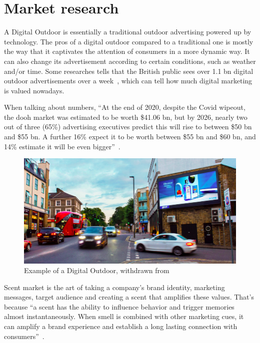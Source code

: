 \section{Market research}
\label{sec:market-research}
A Digital Outdoor is essentially a traditional outdoor advertising powered up by technology. 
The pros of a digital outdoor compared to a traditional one is mostly the way that it captivates the attention of consumers in a more dynamic way. 
It can also change its advertisement according to certain conditions, such as
weather and/or time. Some researches tells that the British public sees over 1.1
\gls{bn} digital outdoor advertisements over a week~\cite{digital-outdoor}, which can tell how much digital marketing is valued nowadays.

When talking about numbers, ``At the end of 2020, despite the Covid wipeout, the \gls{dooh} market was estimated to be worth \$41.06 \gls{bn}, but by 2026, nearly two out of three (65\%) advertising executives predict this will rise to between \$50 \gls{bn} and \$55 \gls{bn}. 
A further 16\% expect it to be worth between \$55 \gls{bn} and \$60 \gls{bn}, and 14\% estimate it will be even bigger''~\cite{outdoor-market}.
%
\begin{figure}[htb!]
\centering
    \includegraphics[width=0.7\columnwidth]{./img/DigitalOutdoor.png}
  \caption{Example of a Digital Outdoor, withdrawn from~\cite{digital-outdoor}}%
\label{fig:dig-outdoor}
\end{figure}

Scent market is the art of taking a company's brand identity, marketing messages, target audience and creating a scent that amplifies these values. 
That's because ``a scent has the ability to influence behavior and trigger memories almost instantaneously. When smell is combined with other marketing cues, it can amplify a brand experience and establish a long lasting connection with consumers''~\cite{scent-market}.

